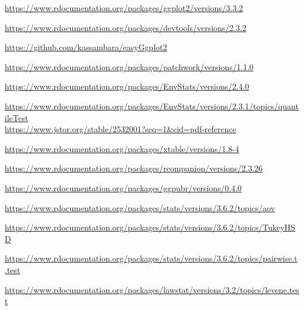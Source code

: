 \documentclass[11pt,a4paper]{article}\usepackage[]{graphicx}\usepackage[]{color}
\begin{document}
\begin{thebibliography}{x}

\url{https://www.rdocumentation.org/packages/ggplot2/versions/3.3.2}

\url{https://www.rdocumentation.org/packages/devtools/versions/2.3.2}

\url{https://github.com/kassambara/easyGgplot2}

\url{https://www.rdocumentation.org/packages/patchwork/versions/1.1.0}

\url{https://www.rdocumentation.org/packages/EnvStats/versions/2.4.0}

\url{https://www.rdocumentation.org/packages/EnvStats/versions/2.3.1/topics/quantileTest}\\
\url{https://www.jstor.org/stable/2532001?seq=1&cid=pdf-reference}

\url{https://www.rdocumentation.org/packages/xtable/versions/1.8-4}

\url{https://www.rdocumentation.org/packages/rcompanion/versions/2.3.26}

\url{https://www.rdocumentation.org/packages/ggpubr/versions/0.4.0}

\url{https://www.rdocumentation.org/packages/stats/versions/3.6.2/topics/aov}

\url{https://www.rdocumentation.org/packages/stats/versions/3.6.2/topics/TukeyHSD}

\url{https://www.rdocumentation.org/packages/stats/versions/3.6.2/topics/pairwise.t.test}

\url{https://www.rdocumentation.org/packages/lawstat/versions/3.2/topics/levene.test}


\end{thebibliography}
\end{document}

